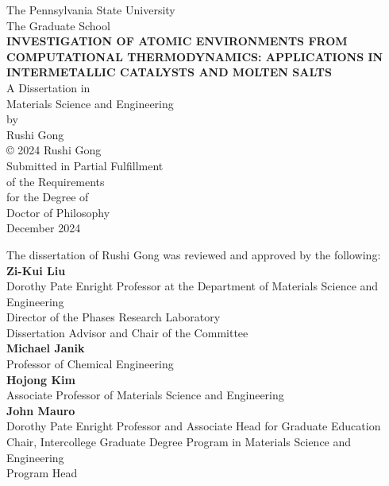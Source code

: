 \documentclass[letterpaper, 12pt]{report}
\begin{document}
\thispagestyle{empty}

{
\centering
The Pennsylvania State University\\
The Graduate School\\
\vfill
{}
{
\fontsize{14}{16}\selectfont
\textbf{INVESTIGATION OF ATOMIC ENVIRONMENTS FROM COMPUTATIONAL THERMODYNAMICS: APPLICATIONS IN INTERMETALLIC CATALYSTS AND MOLTEN SALTS}\\
}
\vfill
A Dissertation in\\
Materials Science and Engineering\\
by\\
Rushi Gong\\
\vfill
© 2024 Rushi Gong\\
\vfill
Submitted in Partial Fulfillment\\
of the Requirements\\
for the Degree of\\

\vfill
Doctor of Philosophy\\
\vfill
December 2024\\
\vfill
}

\newpage
{}
\setlength\parindent{0pt} %

The dissertation of Rushi Gong was reviewed and approved by the following:\\

\textbf{Zi-Kui Liu}\\
Dorothy Pate Enright Professor at the Department of Materials Science and Engineering\\
Director of the Phases Research Laboratory\\
Dissertation Advisor and Chair of the Committee\\

\textbf{Michael Janik}\\
Professor of Chemical Engineering\\

\textbf{Hojong Kim}\\
Associate Professor of Materials Science and Engineering\\

\textbf{John Mauro}\\
Dorothy Pate Enright Professor and Associate Head for Graduate Education\\
Chair, Intercollege Graduate Degree Program in Materials Science and Engineering\\
Program Head
\end{document}
